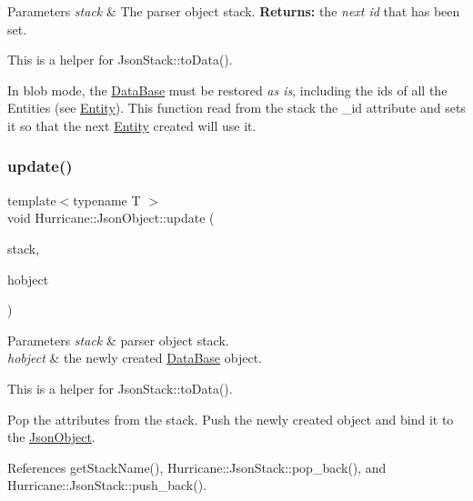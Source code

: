 \begin{DoxyParams}{Parameters}
{\em stack} & The parser object stack. {\bfseries Returns\+:} the {\itshape next id} that has been set.\\
\hline
\end{DoxyParams}
This is a helper for Json\+Stack\+::to\+Data().

In blob mode, the \mbox{\hyperlink{classHurricane_1_1DataBase}{Data\+Base}} must be restored {\itshape as is}, including the {\ttfamily ids} of all the Entities (see \mbox{\hyperlink{classHurricane_1_1Entity}{Entity}}). This function read from the stack the {\ttfamily \+\_\+id} attribute and sets it so that the next \mbox{\hyperlink{classHurricane_1_1Entity}{Entity}} created will use it. \mbox{\label{classHurricane_1_1JsonObject_ace589494452d9d797506286613642cd4}} 
\subsubsection{\texorpdfstring{update()}{update()}}
{\footnotesize\ttfamily template$<$typename T $>$ \\
void Hurricane\+::\+Json\+Object\+::update (\begin{DoxyParamCaption}\item[{\mbox{\hyperlink{classHurricane_1_1JsonStack}{Json\+Stack}} \&}]{stack,  }\item[{T}]{hobject }\end{DoxyParamCaption})\hspace{0.3cm}{\ttfamily [inline]}}


\begin{DoxyParams}{Parameters}
{\em stack} & parser object stack. \\
\hline
{\em hobject} & the newly created \mbox{\hyperlink{classHurricane_1_1DataBase}{Data\+Base}} object.\\
\hline
\end{DoxyParams}
This is a helper for Json\+Stack\+::to\+Data().

Pop the attributes from the stack. Push the newly created object and bind it to the \mbox{\hyperlink{classHurricane_1_1JsonObject}{Json\+Object}}. 

References get\+Stack\+Name(), Hurricane\+::\+Json\+Stack\+::pop\+\_\+back(), and Hurricane\+::\+Json\+Stack\+::push\+\_\+back().

